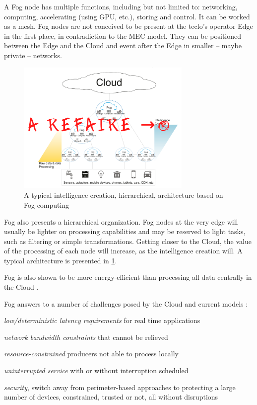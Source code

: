 \documentclass[11pt]{sdm}
\begin{document}
\begin{description}
	A Fog node has multiple functions, including but not limited to: networking, computing, accelerating (using \gls{GPU}, etc.), storing and control. It can be worked as a mesh. Fog nodes are not conceived to be present at the teclo's operator Edge in the first place, in contradiction to the \gls{MEC} model. They can be positioned between the Edge and the Cloud and event after the Edge in smaller -- maybe private -- networks.
	
	\begin{figure}[t]
		\centering
		\includegraphics[width=0.75\textwidth]{./assets/FogArchi.png}
		\caption{A typical intelligence creation, hierarchical, architecture based on Fog computing}
		\label{fig:fog_archi}
	\end{figure}
	
	Fog also presents a hierarchical organization. Fog nodes at the very edge will usually be lighter on processing capabilities and may be reserved to light tasks, such as filtering or simple transformations. Getting closer to the Cloud, the value of the processing of each node will increase, as the intelligence creation will. A typical architecture is presented in \ref{fig:fog_archi}.
	
	Fog is also shown to be more energy-efficient than processing all data centrally in the Cloud \cite{ai_edge_2018}.
	
	Fog answers to a number of challenges posed by the Cloud and current models \cite{chiang_fog_2016}: 
	\begin{enumerate*}[(a)]
		\item \emph{low/deterministic latency requirements} for real time applications
		\item \emph{network bandwidth constraints} that cannot be relieved
		\item \emph{resource-constrained} producers not able to process locally
		\item \emph{uninterrupted service} with or without interruption scheduled
		\item \emph{security}, switch away from perimeter-based approaches to protecting a large number of devices, constrained, trusted or not, all without disruptions
	\end{enumerate*}
	

\end{description}
\end{document}
